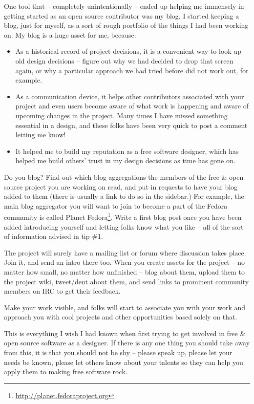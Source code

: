 One tool that -- completely unintentionally -- ended up helping me immensely in
getting started as an open source contributor was my blog. I started keeping a
blog, just for myself, as a sort of rough portfolio of the things I had been
working on. My blog is a huge asset for me, because:
\begin{itemize}
 \item As a historical record of project decisions, it is a convenient way to look up
old design decisions -- figure out why we had decided to drop that screen again,
or why a particular approach we had tried before did not work out, for example.
 \item As a communication device, it helps other contributors associated with your
project and even users become aware of what work is happening and aware of
upcoming changes in the project. Many times I have missed something essential in a
design, and these folks have been very quick to post a comment letting me know!
 \item It helped me to build my reputation as a free software designer, which has
helped me build others' trust in my design decisions as time has gone on. 
\end{itemize}

Do you blog? Find out which blog aggregations the members of the free \& open
source project you are working on read, and put in requests to have your blog
added to them (there is usually a link to do so in the sidebar.) For example, the
main blog aggregator you will want to join to become a part of the Fedora
community is called Planet Fedora\footnote{\url{http://planet.fedoraproject.org}}. Write a first blog
post once you have been added introducing yourself and letting folks know what you
like -- all of the sort of information advised in tip \#1.

The project will surely have a mailing list or forum where discussion takes
place. Join it, and send an intro there too. When you create assets for the
project -- no matter how small, no matter how unfinished -- blog about them,
upload them to the project wiki, tweet/dent about them, and send links to
prominent community members on IRC to get their feedback.

Make your work visible, and folks will start to associate you with your work and
approach you with cool projects and other opportunities based solely on that.


This is everything I wish I had known when first trying to get involved in free
\& open source software as a designer. If there is any one thing you should
take away from this, it is that you should not be shy -- please speak up, please
let your needs be known, please let others know about your talents so they can
help you apply them to making free software rock.
